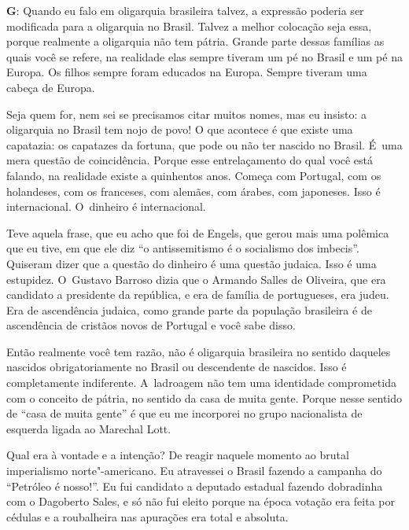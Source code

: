  

\textbf{G}: Quando eu falo em oligarquia brasileira talvez, a expressão
poderia ser modificada para a oligarquia no Brasil. Talvez a melhor
colocação seja essa, porque realmente a oligarquia não tem pátria.
Grande parte dessas famílias as quais você se refere, na realidade elas
sempre tiveram um pé no Brasil e um pé na Europa. Os filhos sempre foram
educados na Europa. Sempre tiveram uma cabeça de Europa.

 

Seja quem for, nem sei se precisamos citar muitos nomes, mas eu insisto:
a oligarquia no Brasil tem nojo de povo! O que acontece é que existe uma
capatazia: os capatazes da fortuna, que pode ou não ter nascido no
Brasil. É~uma mera questão de coincidência. Porque esse entrelaçamento
do qual você está falando, na realidade existe a quinhentos anos. Começa
com Portugal, com os holandeses, com os franceses, com alemães, com
árabes, com japoneses. Isso é internacional. O~dinheiro é internacional.

 

Teve aquela frase, que eu acho que foi de Engels, que gerou mais uma
polêmica que eu tive, em que ele diz ``o antissemitismo é o socialismo
dos imbecis''. Quiseram dizer que a questão do dinheiro é uma questão
judaica. Isso é uma estupidez. O~Gustavo Barroso dizia que o Armando
Salles de Oliveira, que era candidato a presidente da república, e era
de família de portugueses, era judeu. Era de ascendência judaica, como
grande parte da população brasileira é de ascendência de cristãos novos
de Portugal e você sabe disso.

 

Então realmente você tem razão, não é oligarquia brasileira no sentido
daqueles nascidos obrigatoriamente no Brasil ou descendente de nascidos.
Isso é completamente indiferente. A~ladroagem não tem uma identidade
comprometida com o conceito de pátria, no sentido da casa de muita
gente. Porque nesse sentido de ``casa de muita gente'' é que eu me
incorporei no grupo nacionalista de esquerda ligada ao Marechal Lott.

 

Qual era à vontade e a intenção? De reagir naquele momento ao brutal
imperialismo norte"-americano. Eu atravessei o Brasil fazendo a campanha
do ``Petróleo é nosso!''. Eu fui candidato a deputado estadual fazendo
dobradinha com o Dagoberto Sales, e só não fui eleito porque na época
votação era feita por cédulas e a roubalheira nas apurações era total e
absoluta.

